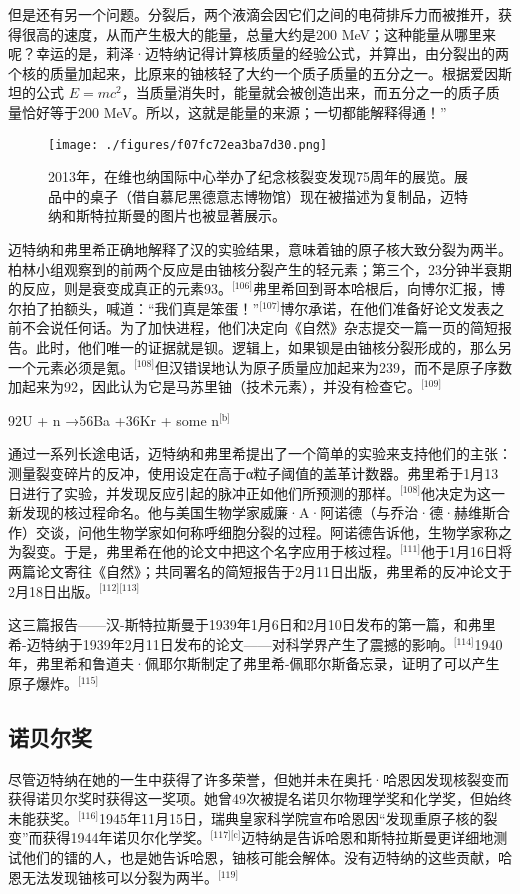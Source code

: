 但是还有另一个问题。分裂后，两个液滴会因它们之间的电荷排斥力而被推开，获得很高的速度，从而产生极大的能量，总量大约是200 MeV；这种能量从哪里来呢？幸运的是，莉泽·迈特纳记得计算核质量的经验公式，并算出，由分裂出的两个核的质量加起来，比原来的铀核轻了大约一个质子质量的五分之一。根据爱因斯坦的公式 $E = mc^2$，当质量消失时，能量就会被创造出来，而五分之一的质子质量恰好等于200 MeV。所以，这就是能量的来源；一切都能解释得通！”
\begin{figure}[ht]
\centering
\texttt{[image: ./figures/f07fc72ea3ba7d30.png]}
\caption{2013年，在维也纳国际中心举办了纪念核裂变发现75周年的展览。展品中的桌子（借自慕尼黑德意志博物馆）现在被描述为复制品，迈特纳和斯特拉斯曼的图片也被显著展示。} \label{fig_LZm_12}
\end{figure}
迈特纳和弗里希正确地解释了汉的实验结果，意味着铀的原子核大致分裂为两半。柏林小组观察到的前两个反应是由铀核分裂产生的轻元素；第三个，23分钟半衰期的反应，则是衰变成真正的元素93。\(^\text{[106]}\)弗里希回到哥本哈根后，向博尔汇报，博尔拍了拍额头，喊道：“我们真是笨蛋！”\(^\text{[107]}\)博尔承诺，在他们准备好论文发表之前不会说任何话。为了加快进程，他们决定向《自然》杂志提交一篇一页的简短报告。此时，他们唯一的证据就是钡。逻辑上，如果钡是由铀核分裂形成的，那么另一个元素必须是氪。\(^\text{[108]}\)但汉错误地认为原子质量应加起来为239，而不是原子序数加起来为92，因此认为它是马苏里铀（技术元素），并没有检查它。\(^\text{[109]}\)

92U + n →56Ba +36Kr + some n\(^\text{[b]}\)

通过一系列长途电话，迈特纳和弗里希提出了一个简单的实验来支持他们的主张：测量裂变碎片的反冲，使用设定在高于α粒子阈值的盖革计数器。弗里希于1月13日进行了实验，并发现反应引起的脉冲正如他们所预测的那样。\(^\text{[108]}\)他决定为这一新发现的核过程命名。他与美国生物学家威廉·A·阿诺德（与乔治·德·赫维斯合作）交谈，问他生物学家如何称呼细胞分裂的过程。阿诺德告诉他，生物学家称之为裂变。于是，弗里希在他的论文中把这个名字应用于核过程。\(^\text{[111]}\)他于1月16日将两篇论文寄往《自然》；共同署名的简短报告于2月11日出版，弗里希的反冲论文于2月18日出版。\(^\text{[112][113]}\)

这三篇报告——汉-斯特拉斯曼于1939年1月6日和2月10日发布的第一篇，和弗里希-迈特纳于1939年2月11日发布的论文——对科学界产生了震撼的影响。\(^\text{[114]}\)1940年，弗里希和鲁道夫·佩耶尔斯制定了弗里希-佩耶尔斯备忘录，证明了可以产生原子爆炸。\(^\text{[115]}\)
\subsection{诺贝尔奖}
尽管迈特纳在她的一生中获得了许多荣誉，但她并未在奥托·哈恩因发现核裂变而获得诺贝尔奖时获得这一奖项。她曾49次被提名诺贝尔物理学奖和化学奖，但始终未能获奖。\(^\text{[116]}\)1945年11月15日，瑞典皇家科学院宣布哈恩因“发现重原子核的裂变”而获得1944年诺贝尔化学奖。\(^\text{[117][c]}\)迈特纳是告诉哈恩和斯特拉斯曼更详细地测试他们的镭的人，也是她告诉哈恩，铀核可能会解体。没有迈特纳的这些贡献，哈恩无法发现铀核可以分裂为两半。\(^\text{[119]}\)

